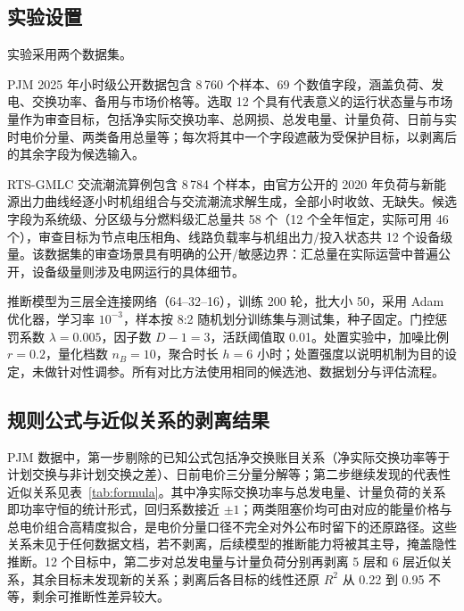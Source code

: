 \documentclass[UTF8,zihao=5,twoside,fontset=none]{ctexart}
\begin{document}
\subsection{实验设置}

实验采用两个数据集。

PJM 2025 年小时级公开数据\cite{ref-pjm-dataminer}包含 8\,760 个样本、69 个数值字段，涵盖负荷、发电、交换功率、备用与市场价格等。选取 12 个具有代表意义的运行状态量与市场量作为审查目标，包括净实际交换功率、总网损、总发电量、计量负荷、日前与实时电价分量、两类备用总量等；每次将其中一个字段遮蔽为受保护目标，以剥离后的其余字段为候选输入。

RTS-GMLC 交流潮流算例\cite{ref-rtsgmlc}包含 8\,784 个样本，由官方公开的 2020 年负荷与新能源出力曲线经逐小时机组组合与交流潮流求解生成，全部小时收敛、无缺失。候选字段为系统级、分区级与分燃料级汇总量共 58 个（12 个全年恒定，实际可用 46 个），审查目标为节点电压相角、线路负载率与机组出力/投入状态共 12 个设备级量。该数据集的审查场景具有明确的公开/敏感边界：汇总量在实际运营中普遍公开，设备级量则涉及电网运行的具体细节。

推断模型为三层全连接网络（64--32--16），训练 200 轮，批大小 50，采用 Adam 优化器\cite{ref-kingma-adam}，学习率 $10^{-3}$，样本按 8:2 随机划分训练集与测试集，种子固定。门控惩罚系数 $\lambda=0.005$，因子数 $D-1=3$，活跃阈值取 0.01。处置实验中，加噪比例 $r=0.2$，量化档数 $n_B=10$，聚合时长 $h=6$ 小时；处置强度以说明机制为目的设定，未做针对性调参。所有对比方法使用相同的候选池、数据划分与评估流程。

\subsection{规则公式与近似关系的剥离结果}

PJM 数据中，第一步剔除的已知公式包括净交换账目关系（净实际交换功率等于计划交换与非计划交换之差）、日前电价三分量分解等；第二步继续发现的代表性近似关系见表~\ref{tab:formula}。其中净实际交换功率与总发电量、计量负荷的关系即功率守恒的统计形式，回归系数接近 $\pm 1$；两类阻塞价均可由对应的能量价格与总电价组合高精度拟合，是电价分量口径不完全对外公布时留下的还原路径。这些关系未见于任何数据文档，若不剥离，后续模型的推断能力将被其主导，掩盖隐性推断。12 个目标中，第二步对总发电量与计量负荷分别再剥离 5 层和 6 层近似关系，其余目标未发现新的关系；剥离后各目标的线性还原 $R^2$ 从 0.22 到 0.95 不等，剩余可推断性差异较大。
\end{document}
